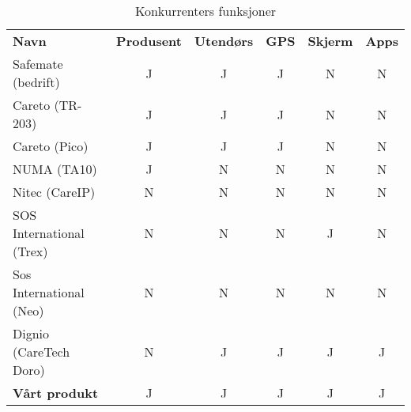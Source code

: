 \begin{table}
  \begin{tabular}{lccccc}
    \textbf{Navn} &
    \textbf{Produsent} &
    \textbf{Utendørs} &
    \textbf{GPS} &
    \textbf{Skjerm} &
    \textbf{Apps} \\

    Safemate (bedrift) & J & J  & J  & N  & N \\
    Careto (TR-203)    & J & J  & J  & N  & N \\
    Careto (Pico)      & J & J  & J  & N  & N \\
    NUMA (TA10)        & J & N  & N  & N  & N \\
    Nitec (CareIP)     & N & N  & N  & N  & N \\
    SOS International
    (Trex)             & N & N  & N  & J  & N \\
    Sos International
    (Neo)              & N & N  & N  & N  & N \\
    Dignio
    (CareTech Doro)    & N & J  & J  & J  & J \\
    \textbf{Vårt produkt}
                       & J & J  & J  & J  & J \\
  \end{tabular}
  \caption{Konkurrenters funksjoner}
  \label{table.konkurrenter.funksjoner}
\end{table}

